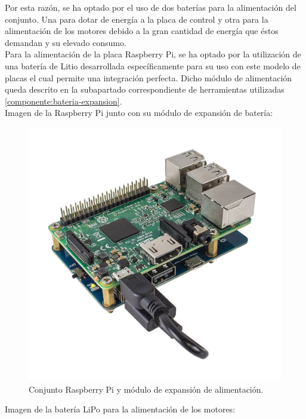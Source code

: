 Por esta razón, se ha optado por el uso de dos baterías para la alimentación del conjunto. Una para dotar de energía a la placa de control y otra para la alimentación de los 
motores debido a la gran cantidad de energía que éstos demandan y su elevado consumo.\\

Para la alimentación de la placa Raspberry Pi, se ha optado por la utilización de una batería de Litio desarrollada específicamente para su uso con este modelo de placas el cual permite una integración
perfecta. Dicho módulo de alimentación queda descrito en la subapartado correspondiente de herramientas utilizadas \ref{componente:bateria-expansion}.\\

Imagen de la Raspberry Pi junto con su módulo de expansión de batería:

\begin{figure}[H]
  \begin{center}
    \includegraphics[scale=0.15]{imagenes/modulo-expansion-rpi.jpg}
  \end{center}
  \caption{Conjunto Raspberry Pi y módulo de expansión de alimentación.}
  \label{figura:rpi-modulo-bateria}
\end{figure}

Imagen de la batería LiPo para la alimentación de los motores:

